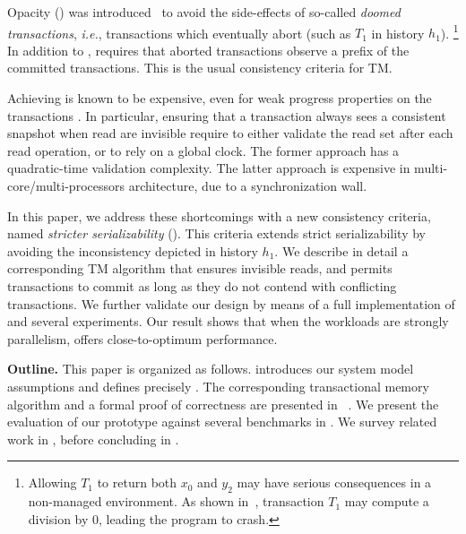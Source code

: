 Opacity (\OPA) was introduced~\cite{guerraoui2008correctness} to avoid the side-effects of so-called \emph{doomed transactions}, \emph{i.e.}, transactions which eventually abort (such as $T_1$ in history $h_1$).%
\footnote{  
  Allowing $T_1$ to return both $x_0$ and $y_2$ may have serious consequences in a non-managed environment.
  As shown in~\cite{guerraoui2008correctness}, transaction $T_1$ may compute a division by $0$, leading the program to crash.
}
In addition to \SSER, \OPA requires that aborted transactions observe a prefix of the committed transactions.
This is the usual consistency criteria for TM.

Achieving \OPA is known to be expensive, even for weak progress properties on the transactions \cite{}.
In particular, ensuring that a transaction always sees a consistent snapshot when read are invisible require to either validate the read set after each read operation, or to rely on a global clock.
The former approach has a quadratic-time validation complexity.
The latter approach is expensive in multi-core/multi-processors architecture, due to a synchronization wall.

In this paper, we address these shortcomings with a new consistency criteria, named \emph{stricter serializability} (\SPSER).
This criteria extends strict serializability by avoiding the inconsistency depicted in history $h_1$.
We describe in detail a corresponding TM algorithm that ensures invisible reads, and permits transactions to commit as long as they do not contend with conflicting transactions.
We further validate our design by means of a full implementation of \SPSER and several experiments.
Our result shows that when the workloads are strongly parallelism, \SPSER offers close-to-optimum performance.

\textbf{Outline.}
This paper is organized as follows.
 introduces our system model assumptions and defines precisely \SPSER.
The corresponding transactional memory algorithm and a formal proof of correctness are presented in ~.
We present the evaluation of our prototype against several benchmarks in .
We survey related work in , before concluding in .
